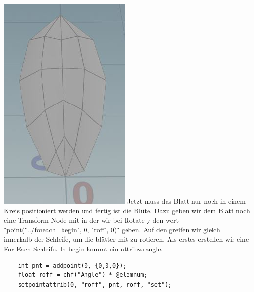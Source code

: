 \begin{​itemize}
\includegraphics*[width=\textwidth]{graphics/blossom3.JPG}
Jetzt muss das Blatt nur noch in einem Kreis positioniert werden und fertig ist die Blüte.
Dazu geben wir dem Blatt noch eine Transform Node mit in der wir bei Rotate y den wert "point("../foreach_begin", 0, "roff", 0)" geben. Auf den greifen wir gleich innerhalb der Schleife, um die blätter mit zu rotieren.
Als erstes erstellen wir eine For Each Schleife. In begin kommt ein attribwrangle.
\begin{lstlisting}
	int pnt = addpoint(0, {0,0,0});
	float roff = chf("Angle") * @elemnum;
	setpointattrib(0, "roff", pnt, roff, "set");
\end{lstlisting} 

\end{​itemize}
